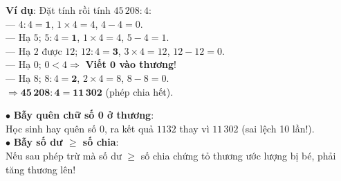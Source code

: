 \documentclass[14pt,a4paper,oneside]{extbook}
\begin{document}
\vspace{2mm}

\noindent
\begin{minipage}[t]{0.53\textwidth}
  \begin{tcolorbox}[
    enhanced,
    title={\footnotesize\bfseries\color{white}\faCheckCircle\ Ví dụ thực hành chuẩn mực},
    colback=green!2!white,
    colframe=green!60!black,
    arc=2.5mm, boxrule=0.8pt, top=1.8mm, bottom=1.8mm, left=2.2mm, right=2.2mm
  ]
    \footnotesize
    \textbf{Ví dụ}: Đặt tính rồi tính $45\,208 : 4$:\\
    --- $4 : 4 = \mathbf{1}$, $1 \times 4 = 4$, $4 - 4 = 0$.\\
    --- Hạ $5$; $5 : 4 = \mathbf{1}$, $1 \times 4 = 4$, $5 - 4 = 1$.\\
    --- Hạ $2$ được $12$; $12 : 4 = \mathbf{3}$, $3 \times 4 = 12$, $12 - 12 = 0$.\\
    --- Hạ $0$; $0 < 4 \Rightarrow$ \textbf{Viết $\mathbf{0}$ vào thương}!\\
    --- Hạ $8$; $8 : 4 = \mathbf{2}$, $2 \times 4 = 8$, $8 - 8 = 0$.\\
    $\Rightarrow \mathbf{45\,208 : 4 = 11\,302}$ (phép chia hết).
  \end{tcolorbox}
\end{minipage}%
\hfill
\begin{minipage}[t]{0.45\textwidth}
  \begin{tcolorbox}[
    enhanced,
    title={\footnotesize\bfseries\color{white}\faExclamationTriangle\ Mẹo tránh bẫy trắc nghiệm},
    colback=red!2!white,
    colframe=red!70!black,
    arc=2.5mm, boxrule=0.8pt, top=1.8mm, bottom=1.8mm, left=2.2mm, right=2.2mm
  ]
    \footnotesize
    $\bullet$ \textbf{Bẫy quên chữ số 0 ở thương}:\\
    Học sinh hay quên số $0$, ra kết quả $1132$ thay vì $11\,302$ (sai lệch 10 lần!).\\
    $\bullet$ \textbf{Bẫy số dư $\ge$ số chia}:\\
    Nếu sau phép trừ mà số dư $\ge$ số chia chứng tỏ thương ước lượng bị bé, phải tăng thương lên!
  \end{tcolorbox}
\end{minipage}
\end{document}
